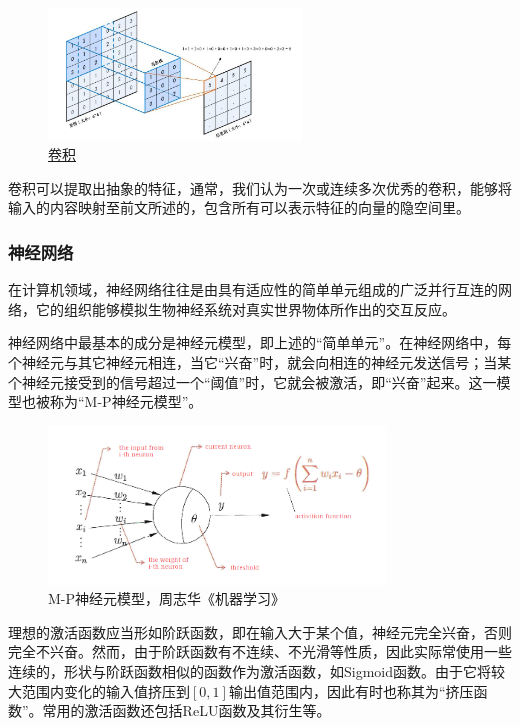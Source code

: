 \documentclass[UTF8,a4paper，12pt]{article}
\theoremstyle{theorem}
\theoremstyle{definition}
\begin{document}
\begin{figure}[htbp]
	\centering
	\includegraphics[width=0.6\textwidth]{assets/03}
	\caption{\href{http://ex2tron.top}{卷积}}
\end{figure}


卷积可以提取出抽象的特征，通常，我们认为一次或连续多次优秀的卷积，能够将输入的内容映射至前文所述的，包含所有可以表示特征的向量的隐空间里。

\subsubsection{神经网络}

在计算机领域，神经网络往往是由具有适应性的简单单元组成的广泛并行互连的网络，它的组织能够模拟生物神经系统对真实世界物体所作出的交互反应。

神经网络中最基本的成分是神经元模型，即上述的“简单单元”。在神经网络中，每个神经元与其它神经元相连，当它“兴奋”时，就会向相连的神经元发送信号；当某个神经元接受到的信号超过一个“阈值”时，它就会被激活，即“兴奋”起来。这一模型也被称为“M-P神经元模型”。

\begin{figure}[htbp]
	\centering
	\includegraphics[width=0.8\textwidth]{assets/04}
	\caption{M-P神经元模型，周志华《机器学习》}
\end{figure}


理想的激活函数应当形如阶跃函数，即在输入大于某个值，神经元完全兴奋，否则完全不兴奋。然而，由于阶跃函数有不连续、不光滑等性质，因此实际常使用一些连续的，形状与阶跃函数相似的函数作为激活函数，如Sigmoid函数。由于它将较大范围内变化的输入值挤压到$[0,1]$输出值范围内，因此有时也称其为“挤压函数”。常用的激活函数还包括ReLU函数及其衍生等。
\end{document}
